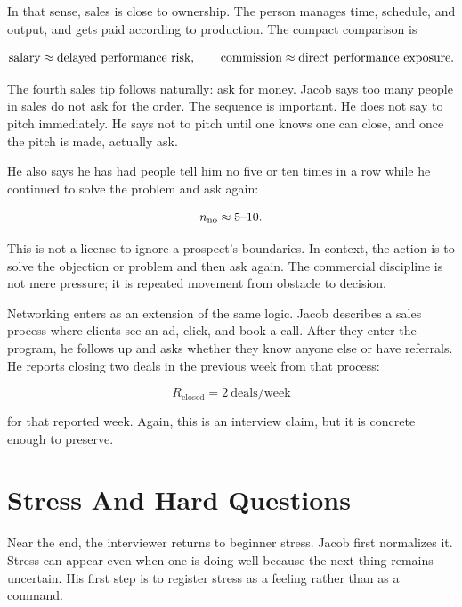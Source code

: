 In that sense, sales is close to ownership. The person manages time, schedule, and output, and gets paid according to production. The compact comparison is

\begin{equation}
\hbox{salary} \approx \hbox{delayed performance risk},
\qquad
\hbox{commission} \approx \hbox{direct performance exposure}.
\end{equation}

The fourth sales tip follows naturally: ask for money. Jacob says too many people in sales do not ask for the order. The sequence is important. He does not say to pitch immediately. He says not to pitch until one knows one can close, and once the pitch is made, actually ask.

He also says he has had people tell him no five or ten times in a row while he continued to solve the problem and ask again:

\begin{equation}
n_{\mathrm{no}} \approx 5\hbox{--}10.
\end{equation}

This is not a license to ignore a prospect's boundaries. In context, the action is to solve the objection or problem and then ask again. The commercial discipline is not mere pressure; it is repeated movement from obstacle to decision.

Networking enters as an extension of the same logic. Jacob describes a sales process where clients see an ad, click, and book a call. After they enter the program, he follows up and asks whether they know anyone else or have referrals. He reports closing two deals in the previous week from that process:

\begin{equation}
R_{\mathrm{closed}} = 2 \ \mathrm{deals/week}
\end{equation}

for that reported week. Again, this is an interview claim, but it is concrete enough to preserve.

\section{Stress And Hard Questions}

Near the end, the interviewer returns to beginner stress. Jacob first normalizes it. Stress can appear even when one is doing well because the next thing remains uncertain. His first step is to register stress as a feeling rather than as a command.

